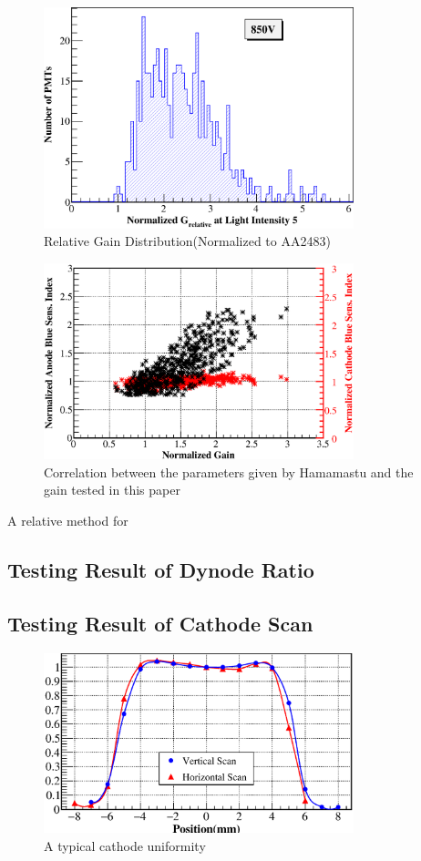 \documentclass[5p, times]{elsarticle}
\begin{document}
\begin{figure}[h!]
 \centering
 \includegraphics[width=90mm]{GainDist}
\caption{Relative Gain Distribution(Normalized to AA2483)}
\label{fig:gain_dist}
\end{figure} 

\begin{figure}[h!]
 \centering
 \includegraphics[width=90mm]{correlation}
\caption{Correlation between the parameters given by Hamamastu and the gain tested in this paper}
\label{fig:correl_abVSgain}
\end{figure} 

A relative method for 


\subsection{Testing Result of Dynode Ratio}
\label{sec:psd_dy58}



\subsection{Testing Result of Cathode Scan}
\label{sec:psd_cathodescan}

\begin{figure}[h!]
 \centering
 \includegraphics[width=90mm]{cathode_uniformity}
\caption{A typical cathode uniformity}
\label{fig:cathode_uniformity}
\end{figure} 
\end{document}
